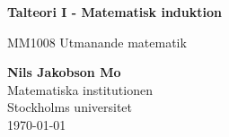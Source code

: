 \begin{titlepage}
    \begin{center}
        \vspace*{1cm}
            
        \Huge
        \textbf{Talteori I - Matematisk induktion}
            
        \vspace{0.5cm}
        \LARGE
        MM1008 Utmanande matematik

        \vfill
            
        \vspace{0.8cm}
            
        \Large
        \textbf{Nils Jakobson Mo} \\
        Matematiska institutionen\\
        Stockholms universitet\\
        \today
            
    \end{center}
\end{titlepage}